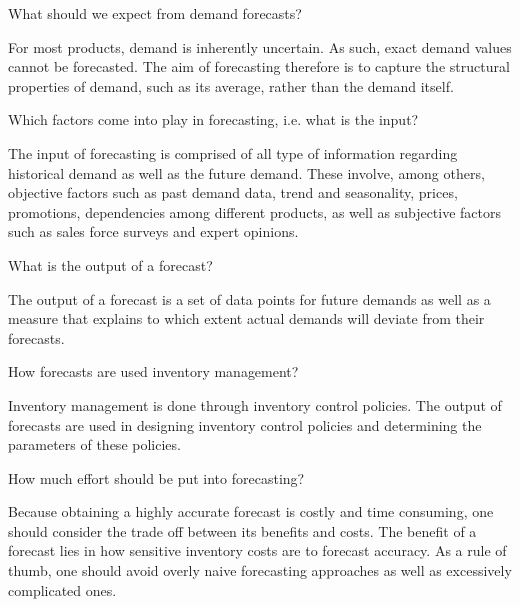 \begin{question}
What should we expect from demand forecasts?

  \begin{solution}
	For most products, demand is inherently uncertain. As such, exact demand values cannot be forecasted. The aim of forecasting therefore is to capture the structural properties of demand, such as its average, rather than the demand itself.  
	

  \end{solution}
\end{question}

\begin{question}
Which factors come into play in forecasting, i.e. what is the input?

  \begin{solution}
    The input of forecasting is comprised of all type of information regarding historical demand as well as the future demand. These involve, among others, objective factors such as past demand data, trend and seasonality, prices, promotions, dependencies among different products, as well as subjective factors such as sales force surveys and expert opinions.     
  \end{solution}
\end{question}

\begin{question}
What is the output of a forecast?

  \begin{solution}
    The output of a forecast is a set of data points for future demands as well as a measure that explains to which extent actual demands will deviate from their forecasts.
  \end{solution}
\end{question}

\begin{question}
How forecasts are used inventory management?

  \begin{solution}
	Inventory management is done through inventory control policies. The output of forecasts are used in designing inventory control policies and determining the parameters of these policies.
  \end{solution}
\end{question}

\begin{question}
How much effort should be put into forecasting?

  \begin{solution}
	Because obtaining a highly accurate forecast is costly and time consuming, one should consider the trade off between its benefits and costs. The benefit of a forecast lies in how sensitive inventory costs are to forecast accuracy. As a rule of thumb, one should avoid overly naive forecasting approaches as well as excessively complicated ones. 
  \end{solution}
\end{question}

